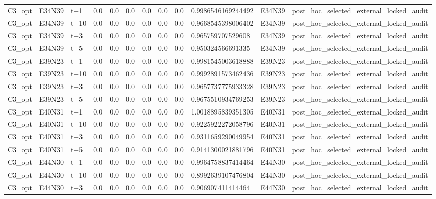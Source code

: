 \begin{landscape}
\begin{longtable}{llllllllllll}
C3\_opt & E34N39 & t+1 & 0.0 & 0.0 & 0.0 & 0.0 & 0.0 & 0.0 & 0.9986546169244492 & E34N39 & post\_hoc\_selected\_external\_locked\_audit \\
C3\_opt & E34N39 & t+10 & 0.0 & 0.0 & 0.0 & 0.0 & 0.0 & 0.0 & 0.9668545398006402 & E34N39 & post\_hoc\_selected\_external\_locked\_audit \\
C3\_opt & E34N39 & t+3 & 0.0 & 0.0 & 0.0 & 0.0 & 0.0 & 0.0 & 0.965759707529608 & E34N39 & post\_hoc\_selected\_external\_locked\_audit \\
C3\_opt & E34N39 & t+5 & 0.0 & 0.0 & 0.0 & 0.0 & 0.0 & 0.0 & 0.950324566691335 & E34N39 & post\_hoc\_selected\_external\_locked\_audit \\
C3\_opt & E39N23 & t+1 & 0.0 & 0.0 & 0.0 & 0.0 & 0.0 & 0.0 & 0.9981545003618888 & E39N23 & post\_hoc\_selected\_external\_locked\_audit \\
C3\_opt & E39N23 & t+10 & 0.0 & 0.0 & 0.0 & 0.0 & 0.0 & 0.0 & 0.9992891573462436 & E39N23 & post\_hoc\_selected\_external\_locked\_audit \\
C3\_opt & E39N23 & t+3 & 0.0 & 0.0 & 0.0 & 0.0 & 0.0 & 0.0 & 0.9657737775933328 & E39N23 & post\_hoc\_selected\_external\_locked\_audit \\
C3\_opt & E39N23 & t+5 & 0.0 & 0.0 & 0.0 & 0.0 & 0.0 & 0.0 & 0.9675510934769253 & E39N23 & post\_hoc\_selected\_external\_locked\_audit \\
C3\_opt & E40N31 & t+1 & 0.0 & 0.0 & 0.0 & 0.0 & 0.0 & 0.0 & 1.0018895839351305 & E40N31 & post\_hoc\_selected\_external\_locked\_audit \\
C3\_opt & E40N31 & t+10 & 0.0 & 0.0 & 0.0 & 0.0 & 0.0 & 0.0 & 0.9225922272058796 & E40N31 & post\_hoc\_selected\_external\_locked\_audit \\
C3\_opt & E40N31 & t+3 & 0.0 & 0.0 & 0.0 & 0.0 & 0.0 & 0.0 & 0.9311659290049954 & E40N31 & post\_hoc\_selected\_external\_locked\_audit \\
C3\_opt & E40N31 & t+5 & 0.0 & 0.0 & 0.0 & 0.0 & 0.0 & 0.0 & 0.9141300021881796 & E40N31 & post\_hoc\_selected\_external\_locked\_audit \\
C3\_opt & E44N30 & t+1 & 0.0 & 0.0 & 0.0 & 0.0 & 0.0 & 0.0 & 0.9964758837414464 & E44N30 & post\_hoc\_selected\_external\_locked\_audit \\
C3\_opt & E44N30 & t+10 & 0.0 & 0.0 & 0.0 & 0.0 & 0.0 & 0.0 & 0.8992639107476804 & E44N30 & post\_hoc\_selected\_external\_locked\_audit \\
C3\_opt & E44N30 & t+3 & 0.0 & 0.0 & 0.0 & 0.0 & 0.0 & 0.0 & 0.906907411414464 & E44N30 & post\_hoc\_selected\_external\_locked\_audit \\

\end{longtable}
\end{landscape}
